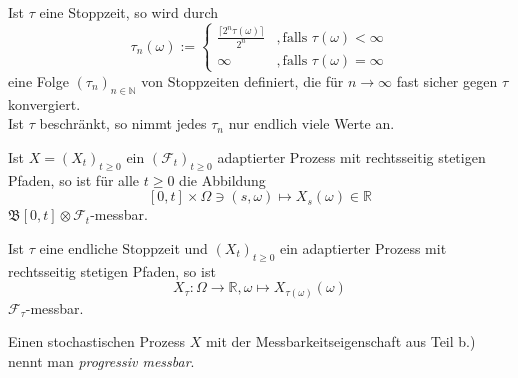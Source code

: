 \documentclass[a4paper,twoside,DIV15,BCOR12mm]{scrbook}
\newcommand{\cF}{\mathcal F}
\newcommand{\borel}{{\mathfrak B}}
\begin{document}
\begin{lemma}
\label{lemma:13.1}
  \begin{enuma}
  \item Ist $\tau$ eine Stoppzeit, so wird durch
\[
\tau_n(\omega):=\left\{\begin{array}{cc}\frac{\lceil2^n\tau(\omega)\rceil}{2^n} &,\text{falls } \tau(\omega)<\infty \\ \infty &,\text{falls } \tau(\omega)=\infty\end{array}\right.
\]
eine Folge $(\tau_n)_{n\in\mathbb N}$ von Stoppzeiten definiert, die für $n\to\infty$ fast sicher gegen $\tau$ konvergiert. \\
Ist $\tau$ beschränkt, so nimmt jedes $\tau_n$ nur endlich viele Werte an.
\item Ist $X=(X_t)_{t\geq0}$ ein $(\cF_t)_{t\geq0}$ adaptierter Prozess mit rechtsseitig stetigen Pfaden, so ist für alle $t\geq0$ die Abbildung
\[
[0,t]\times\Omega\ni(s,\omega)\mapsto X_s(\omega)\in\mathbb R
\]
$\borel[0,t]\otimes\cF_t$-messbar.
\item Ist $\tau$ eine endliche Stoppzeit und $(X_t)_{t\geq0}$ ein adaptierter Prozess mit rechtsseitig stetigen Pfaden, so ist
\[
X_\tau:\Omega\longrightarrow\mathbb R, \omega\mapsto X_{\tau(\omega)}(\omega)
\]
$\cF_\tau$-messbar.
  \end{enuma}
\end{lemma}
\begin{bemerkung}
  Einen stochastischen Prozess $X$ mit der Messbarkeitseigenschaft aus Teil b.) nennt man \emph{progressiv messbar}.
\end{bemerkung}
\end{document}
